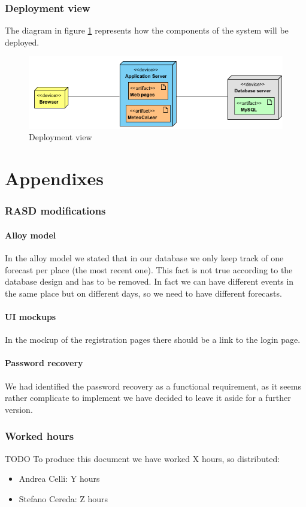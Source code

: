 \documentclass[10pt,a4paper,titlepage]{article}
\begin{document}
\section{Deployment view}
The diagram in figure \ref{fig:deployment_view} represents how the components of the system will be deployed.
\begin{figure}[h]
\centering
\includegraphics[width=\linewidth]{./images/deployment_view}
\caption[deploy]{Deployment view}
\label{fig:deployment_view}
\end{figure}

\clearpage
\part{Appendixes}
\label{part:appendixes}
\section{RASD modifications}
\subsection{Alloy model}
In the alloy model we stated that in our database we only keep track of one forecast per place (the most recent one). This fact is not true according to the database design and has to be removed. In fact we can have different events in the same place but on different days, so we need to have different forecasts.
\subsection{UI mockups}
In the mockup of the registration pages there should be a link to the login page. 
\subsection{Password recovery}
We had identified the password recovery as a functional requirement, as it seems rather complicate to implement we have decided to leave it aside for a further version.

\section{Worked hours}
TODO
To produce this document we have worked X hours, so distributed:
\begin{itemize}
\item Andrea Celli: Y hours
\item Stefano Cereda: Z hours
\end{itemize}

\clearpage
\tableofcontents
\end{document}
